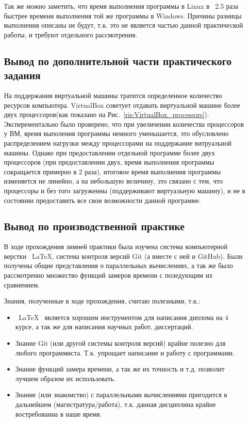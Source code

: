 \documentclass{article}
\begin{document}
				Так же можно заметить, что время выполнения программы в Linux в ~2.5 раза быстрее времени выполнения той же 					программы в Windows. Причины разницы выполнения описаны не будут, т.к. это не является частью данной практической 					работы, и требуют отдельного рассмотрения.
		\subsection{Вывод по дополнительной части практического задания}
				На поддержания виртуальной машины тратится определенное количество ресурсов компьютера. VirtualBox советует 					отдавать виртуальной машине более двух процессоров(как показано на Рис.~\ref{ris:VirtualBox_processors}). 							Эксперементально было проверено, что при увеличении количества процессоров у ВМ, время выполения программы немного 					уменьшается, это обусловлено распределением нагрузки между процессорами на поддержание витруальной машины. Однако при 			предоставлении отдельной программе более  двух процессоров (при предоставлении двух, время выполнения программы 					сокращается примерно в 2 раза), итоговое время выполнения программы изменяется не линейно, а на небольшую величину, 				это связано с тем, что процессоры и без того загруженны (поддерживают виртуальную машину), и не в состоянии 						предоставить все свои возможности данной программе. 
	\newpage
		\subsection{Вывод по производственной практике}
			В ходе прохождения зимней практики была изучена система компьютерной верстки ~\LaTeX, система контроля версий Git (а 			вместе с ней и GitHub). Были получены общие представления о параллельных вычислениях, а так же было рассмотренно 					множество функций замеров времени с поледующим их сравнением. 
		
			Знания, полученные в ходе прохождения, считаю полезными, т.к.:
		\begin{itemize}
			\item ~\LaTeX~ является хорошим инструментом для написания диплома на 4 курсе, а так же для написания научных 						работ, диссертаций.  
			\item Знание Git (или другой системы контроля версий) крайне полезно для любого программиста. Т.к. упрощает 						написание и работу с программами.
			\item Знание функций замера времени, а так же их точность и т.д. позволит лучшем образом их использовать.
			\item Знание (или знакомство) с параллельными вычислениями пригодится в дальнейшем (магистратура/работа), т.к. 						данная дисциплина крайне востребованна в наше время.
		\end{itemize}
	
\end{document}
